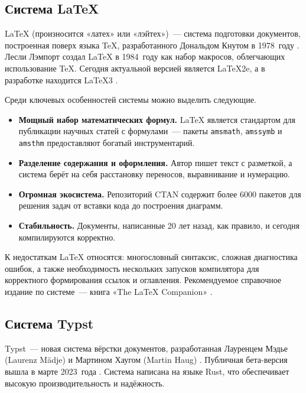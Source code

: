 \subsection{Система {\LaTeX}}

{\LaTeX} (произносится «латех» или «лэйтех»)~--- система подготовки документов, построенная поверх языка {\TeX}, разработанного Дональдом Кнутом в 1978~году \cite{knuth1984texbook}. Лесли Лэмпорт создал {\LaTeX} в 1984~году как набор макросов, облегчающих использование {\TeX}. Сегодня актуальной версией является {\LaTeX}2e, а в разработке находится {\LaTeX}3 \cite{latex-project}.

Среди ключевых особенностей системы можно выделить следующие.
\begin{itemize}
    \item \textbf{Мощный набор математических формул.} {\LaTeX} является стандартом для публикации научных статей с формулами~--- пакеты \texttt{amsmath}, \texttt{amssymb} и \texttt{amsthm} предоставляют богатый инструментарий.
    \item \textbf{Разделение содержания и оформления.} Автор пишет текст с разметкой, а система берёт на себя расстановку переносов, выравнивание и нумерацию.
    \item \textbf{Огромная экосистема.} Репозиторий CTAN содержит более 6000 пакетов для решения задач от вставки кода \cite{minted-ctan} до построения диаграмм.
    \item \textbf{Стабильность.} Документы, написанные 20 лет назад, как правило, и сегодня компилируются корректно.
\end{itemize}

К недостаткам {\LaTeX} относятся: многословный синтаксис, сложная диагностика ошибок, а также необходимость нескольких запусков компилятора для корректного формирования ссылок и оглавления. Рекомендуемое справочное издание по системе~--- книга «The {\LaTeX} Companion» \cite{mittelbach2004latex}.

\subsection{Система Typst}

Typst~--- новая система вёрстки документов, разработанная Лауренцем Мэдье (Laurenz Mädje) и Мартином Хаугом (Martin Haug) \cite{typst-github}. Публичная бета-версия вышла в марте 2023~года \cite{typst-blog-2023}. Система написана на языке Rust, что обеспечивает высокую производительность и надёжность.

